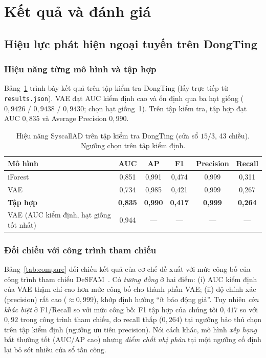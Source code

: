 \section{Kết quả và đánh giá}
\label{sec:evaluation}

\subsection{Hiệu lực phát hiện ngoại tuyến trên DongTing}

\subsubsection{Hiệu năng từng mô hình và tập hợp}
Bảng~\ref{tab:offline} trình bày kết quả trên tập kiểm tra DongTing (lấy trực tiếp
từ \texttt{results.json}). VAE đạt AUC kiểm định cao và ổn định qua ba hạt giống
($0{,}9426$ / $0{,}9438$ / $0{,}9430$; chọn hạt giống~1). Trên tập kiểm tra, tập
hợp đạt AUC $0{,}835$ và Average Precision $0{,}990$.

\begin{table}[htbp]
  \centering
  \caption{Hiệu năng SyscallAD trên tập kiểm tra DongTing (cửa sổ $15/3$, 43 chiều).
           Ngưỡng chọn trên tập kiểm định.}
  \label{tab:offline}
  \begin{tabular}{lccccc}
    \toprule
    \textbf{Mô hình} & \textbf{AUC} & \textbf{AP} & \textbf{F1} & \textbf{Precision} & \textbf{Recall} \\
    \midrule
    iForest          & 0{,}851 & 0{,}991 & 0{,}474 & 0{,}999 & 0{,}311 \\
    VAE              & 0{,}734 & 0{,}985 & 0{,}421 & 0{,}999 & 0{,}267 \\
    \textbf{Tập hợp} & \textbf{0{,}835} & \textbf{0{,}990} & \textbf{0{,}417} & \textbf{0{,}999} & \textbf{0{,}264} \\
    \midrule
    VAE (AUC kiểm định, hạt giống tốt nhất) & 0{,}944 & --- & --- & --- & --- \\
    \bottomrule
  \end{tabular}
\end{table}

\subsubsection{Đối chiếu với công trình tham chiếu}
Bảng~\ref{tab:compare} đối chiếu kết quả của cơ chế đề xuất với mức công bố của
công trình tham chiếu DeSFAM~\cite{desfam_original}. Có \emph{tương đồng} ở hai
điểm: (i) AUC kiểm định của VAE thậm chí cao hơn mức công bố cho thành phần VAE;
(ii) độ chính xác (precision) rất cao ($\approx 0{,}999$), khớp định hướng ``ít báo
động giả''. Tuy nhiên \emph{còn khác biệt} ở F1/Recall so với mức công bố: F1 tập
hợp của chúng tôi
$0{,}417$ so với $0{,}92$ trong công trình tham chiếu, do recall thấp ($0{,}264$) tại ngưỡng bảo
thủ chọn trên tập kiểm định (ngưỡng ưu tiên precision). Nói cách khác, mô hình
\emph{xếp hạng} bất thường tốt (AUC/AP cao) nhưng \emph{điểm chốt nhị phân} tại
một ngưỡng cố định lại bỏ sót nhiều cửa sổ tấn công.

